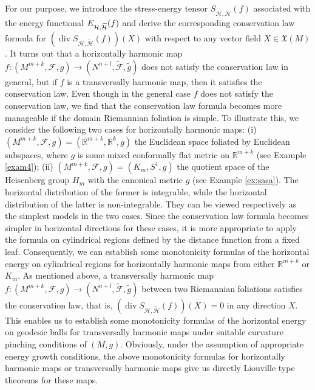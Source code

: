 \documentclass[12pt,reqno]{amsart}
\theoremstyle{definition}
\DeclareMathOperator{\di}{div}
\def\rr{{\mathbb R}}
\begin{document}
	For our purpose, we introduce the stress-energy tensor $S_{\mathcal{H},%
	\widetilde{\mathcal{H}}}(f)$ associated with the energy functional $E_{%
	\mathcal{H},\widetilde{\mathcal{H}}}(f)$ and derive the corresponding
	conservation law formula for $(\di S_{\mathcal{H},\widetilde{\mathcal{H
    	}}}(f))(X)$ with respect to any vector field $X\in \mathfrak{X}(M)$. It
	turns out that a horizontally harmonic map $f:(M^{m+k},\mathcal{F}
	,g)\rightarrow (N^{n+l},\widetilde{\mathcal{F}},\widetilde{g})$ does not
	satisfy the conservation law in general, but if $f$ is a transversally
	harmonic map, then it satisfies the conservation law. Even though in the
	general case $f$ does not satisfy the conservation law, we find that the
	conservation law formula becomes more manageable if  the domain
	Riemannian foliation is simple. To illustrate this, we consider the
	following two cases for horizontally harmonic maps: (i) $(M^{m+k},\mathcal{F%
	},g)=(%
	\mathbb{R}
	^{m+k},%
	\mathbb{R}
	^{k},g)$ the Euclidean space foliated by Euclidean subspaces, where $g$ is
	some mixed conformally flat metric on $%
	\mathbb{R}
	^{m+k}$ (see Example \ref{exam4}); (ii) $(M^{m+k},\mathcal{F},g)=(K_{m},S^{1},g)$
	the quotient space of the Heisenberg group $H_{m}$ with the canonical metric 
	$g$ (see Example \ref{ex:sasa}). The horizontal distribution of the former is
	integrable, while the horizontal distribution of the latter is
	non-integrable. They can be viewed respectively as the simplest models in
	the two cases. Since the conservation law formula becomes simpler in
	horizontal directions for these cases, it is more appropriate to apply the
	formula on cylindrical regions defined by the distance function from a fixed
	leaf. Consequently, we can establish some monotonicity formulas of the
	horizontal energy on cylindrical regions for horizontally harmonic maps from
	either $\rr^{m+k}$ or $K_{m}$. As mentioned above, a transversally harmonic
	map  $f:(M^{m+k},\mathcal{F},g)\rightarrow (N^{n+l},\widetilde{\mathcal{F}},%
	\widetilde{g})$ between two Riemannian foliations satisfies the conservation
	law, that is, $(\di S_{\mathcal{H},\widetilde{\mathcal{H}}}(f))(X)=0$
	in any direction $X$. This enables us to establish some monotonicity
	formulas of the horizontal energy on geodesic balls for transversally
	harmonic maps under suitable curvature pinching conditions of $(M,g)$.
	Obviously, under the assumption of appropriate energy growth conditions, the
	above monotonicity formulas for horizontally harmonic maps or transversally
	harmonic maps give us directly Liouville type theorems for these maps.
	
\end{document}
